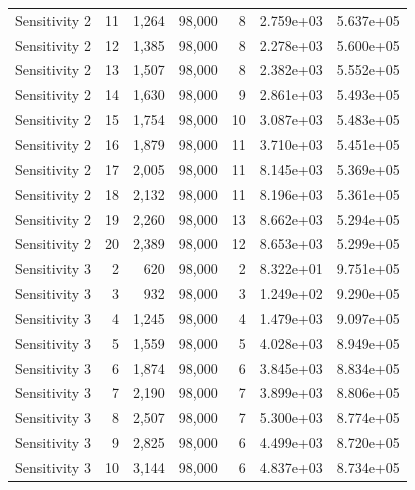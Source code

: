 \begin{table}[]
\begin{tabular}{lrrrrrr}
     Sensitivity 2 &   11 & 1,264 &             98,000 &                   8 & 2.759e+03 & 5.637e+05 \\
     Sensitivity 2 &   12 & 1,385 &             98,000 &                   8 & 2.278e+03 & 5.600e+05 \\
     Sensitivity 2 &   13 & 1,507 &             98,000 &                   8 & 2.382e+03 & 5.552e+05 \\
     Sensitivity 2 &   14 & 1,630 &             98,000 &                   9 & 2.861e+03 & 5.493e+05 \\
     Sensitivity 2 &   15 & 1,754 &             98,000 &                  10 & 3.087e+03 & 5.483e+05 \\
     Sensitivity 2 &   16 & 1,879 &             98,000 &                  11 & 3.710e+03 & 5.451e+05 \\
     Sensitivity 2 &   17 & 2,005 &             98,000 &                  11 & 8.145e+03 & 5.369e+05 \\
     Sensitivity 2 &   18 & 2,132 &             98,000 &                  11 & 8.196e+03 & 5.361e+05 \\
     Sensitivity 2 &   19 & 2,260 &             98,000 &                  13 & 8.662e+03 & 5.294e+05 \\
     Sensitivity 2 &   20 & 2,389 &             98,000 &                  12 & 8.653e+03 & 5.299e+05 \\
     Sensitivity 3 &    2 &   620 &             98,000 &                   2 & 8.322e+01 & 9.751e+05 \\
     Sensitivity 3 &    3 &   932 &             98,000 &                   3 & 1.249e+02 & 9.290e+05 \\
     Sensitivity 3 &    4 & 1,245 &             98,000 &                   4 & 1.479e+03 & 9.097e+05 \\
     Sensitivity 3 &    5 & 1,559 &             98,000 &                   5 & 4.028e+03 & 8.949e+05 \\
     Sensitivity 3 &    6 & 1,874 &             98,000 &                   6 & 3.845e+03 & 8.834e+05 \\
     Sensitivity 3 &    7 & 2,190 &             98,000 &                   7 & 3.899e+03 & 8.806e+05 \\
     Sensitivity 3 &    8 & 2,507 &             98,000 &                   7 & 5.300e+03 & 8.774e+05 \\
     Sensitivity 3 &    9 & 2,825 &             98,000 &                   6 & 4.499e+03 & 8.720e+05 \\
     Sensitivity 3 &   10 & 3,144 &             98,000 &                   6 & 4.837e+03 & 8.734e+05 \\

\end{tabular}
\end{table}
